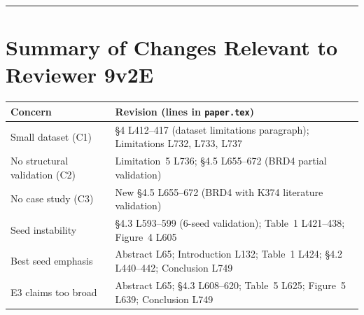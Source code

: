 \documentclass[11pt]{article}
\begin{document}
\bigskip
\hrule
\bigskip

\section*{Summary of Changes Relevant to Reviewer 9v2E}

\begin{center}
\small
\begin{tabular}{@{}p{3.5cm}p{8cm}@{}}
\toprule
\textbf{Concern} & \textbf{Revision (lines in \texttt{paper.tex})} \\
\midrule
Small dataset (C1) & \S4 L412--417 (dataset limitations paragraph); Limitations L732, L733, L737 \\
No structural validation (C2) & Limitation~5 L736; \S4.5 L655--672 (BRD4 partial validation) \\
No case study (C3) & New \S4.5 L655--672 (BRD4 with K374 literature validation) \\
Seed instability & \S4.3 L593--599 (6-seed validation); Table~1 L421--438; Figure~4 L605 \\
Best seed emphasis & Abstract L65; Introduction L132; Table~1 L424; \S4.2 L440--442; Conclusion L749 \\
E3 claims too broad & Abstract L65; \S4.3 L608--620; Table~5 L625; Figure~5 L639; Conclusion L749 \\
\bottomrule
\end{tabular}
\end{center}
\end{document}
